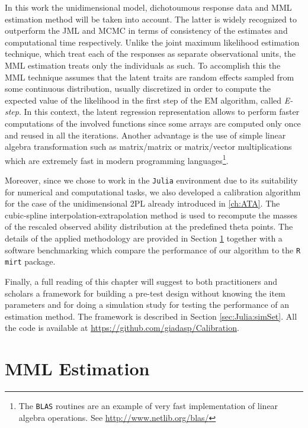 In this work the unidimensional model, dichotoumous response data and MML estimation method will be taken into account. The latter is widely recognized to outperform the JML and MCMC in terms of consistency of the estimates \parencite{andersen1977sufficient, neyman1948consistent} and computational time  \parencite{patz1999applications} respectively. Unlike the joint maximum likelihood estimation technique, which treat each of the responses as separate observational units, the MML estimation treats only the individuals as such. To accomplish this the MML technique assumes that the latent traits are random effects sampled from some continuous distribution, usually discretized in order to compute the expected value of the likelihood in the first step of the EM algorithm, called \emph{E-step}. In this context, the latent regression representation allows to perform faster computations of the involved functions since some arrays are computed only once and reused in all the iterations. Another advantage is the use of simple linear algebra transformation such as matrix/matrix or matrix/vector multiplications which are extremely fast in modern programming languages\footnote{The \texttt{BLAS} routines are an example of very fast implementation of linear algebra operations. See  \url{http://www.netlib.org/blas/}}. 

Moreover, since we chose to work in the \texttt{Julia} environment due to its suitability for numerical and computational tasks, we also developed a calibration algorithm for the case of the unidimensional 2PL already introduced in \ref{ch:ATA}. The cubic-spline interpolation-extrapolation method \parencite{birkhoff1960smooth} is used to recompute the masses of the rescaled observed ability distribution at the predefined theta points. The details of the applied methodology are provided in Section \ref{sec:estimation} together with a software benchmarking which compare the performance of our algorithm to the \texttt{R} \texttt{mirt} package.

Finally, a full reading of this chapter will suggest to both practitioners and scholars a framework for building a pre-test design without knowing the item parameters and for doing a simulation study for testing the performance of an estimation method. The framework is described in Section \ref{sec:Julia:simSet}. All the code is available at \url{https://github.com/giadasp/Calibration}.


\section{MML Estimation}\label{sec:estimation}

